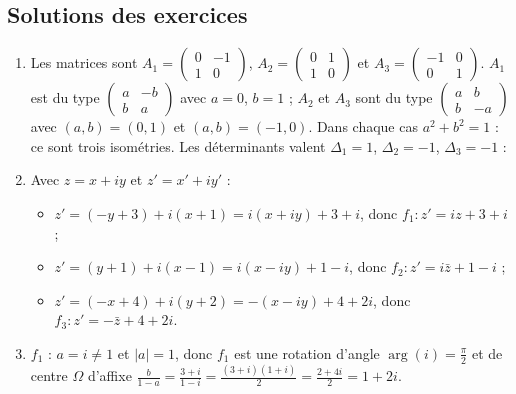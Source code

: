 \begin{corrige}
\section{Solutions des exercices}
\begin{sol}
\begin{enumerate}
      \item Les matrices sont
            $A_1 = \begin{pmatrix} 0 & -1 \\ 1 & 0 \end{pmatrix}$,
            $A_2 = \begin{pmatrix} 0 & 1 \\ 1 & 0 \end{pmatrix}$ et
            $A_3 = \begin{pmatrix} -1 & 0 \\ 0 & 1 \end{pmatrix}$.
            $A_1$ est du type $\begin{pmatrix} a & -b \\ b & a \end{pmatrix}$ avec $a = 0$, $b = 1$ ;
            $A_2$ et $A_3$ sont du type $\begin{pmatrix} a & b \\ b & -a \end{pmatrix}$ avec $(a,b) = (0,1)$ et $(a,b) = (-1,0)$.
            Dans chaque cas $a^2 + b^2 = 1$ : ce sont trois isométries.
            Les déterminants valent $\Delta_1 = 1$, $\Delta_2 = -1$, $\Delta_3 = -1$ :
      \item Avec $z = x + iy$ et $z' = x' + iy'$ :
            \begin{itemize}
                  \item $z' = (-y+3) + i(x+1) = i(x+iy) + 3 + i$, donc $f_1 : z' = iz + 3 + i$ ;
                  \item $z' = (y+1) + i(x-1) = i(x - iy) + 1 - i$, donc $f_2 : z' = i\bar{z} + 1 - i$ ;
                  \item $z' = (-x+4) + i(y+2) = -(x - iy) + 4 + 2i$, donc $f_3 : z' = -\bar{z} + 4 + 2i$.
            \end{itemize}
      \item $f_1$ : $a = i \neq 1$ et $|a| = 1$, donc $f_1$ est une rotation d'angle $\arg(i) = \frac{\pi}{2}$ et de centre
            $\Omega$ d'affixe $\frac{b}{1-a} = \frac{3+i}{1-i} = \frac{(3+i)(1+i)}{2} = \frac{2+4i}{2} = 1 + 2i$.


\end{enumerate}
\end{sol}
\end{corrige}
